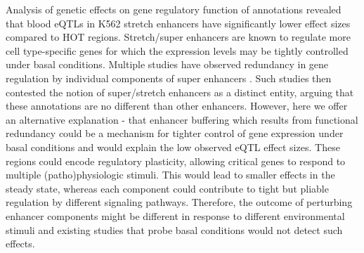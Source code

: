 Analysis of genetic effects on gene regulatory function of annotations revealed that blood eQTLs in K562 stretch enhancers have significantly lower effect sizes compared to HOT regions. Stretch/super enhancers are known to regulate more cell type-specific genes for which the expression levels may be tightly controlled under basal conditions. Multiple studies have observed redundancy in gene regulation by individual components of super enhancers \cite{hayGeneticDissectionAglobin2016, shinHierarchyMammarySTAT5driven2016, moorthyEnhancersSuperenhancersHave2017, xieMultiplexedEngineeringAnalysis2017}. Such studies then contested the notion of super/stretch enhancers as a distinct entity, arguing that these annotations are no different than other enhancers. However, here we offer an alternative explanation - that enhancer buffering which results from functional redundancy could be a mechanism for tighter control of gene expression under basal conditions and would explain the low observed eQTL effect sizes. These regions could encode regulatory plasticity, allowing critical genes to respond to multiple (patho)physiologic stimuli. This would lead to smaller effects in the steady state, whereas each component could contribute to tight but pliable regulation by different signaling pathways. Therefore, the outcome of perturbing enhancer components might be different in response to different environmental stimuli and existing studies that probe basal conditions would not detect such effects.\\


